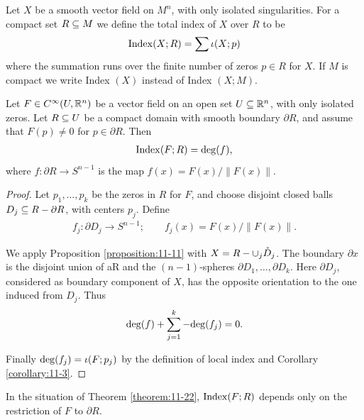 \begin{definition}\label{definition:11-21}
  Let $X$ be a smooth vector field on $M^n$, with only isolated
  singularities. For a compact set $R\subseteq M$ we define the total index of $X$ over
  $R$ to be
  \begin{align*}
    \mathrm{Index}(X; R) = \sum \iota(X; p)
  \end{align*}
  where the summation runs over the finite number of zeros $p\in R$ for $X$. If $M$ is
  compact we write Index $(X)$ instead of Index $(X; M)$.
\end{definition}

\begin{theorem}\label{theorem:11-22}
  Let $F\in C^\infty(U, {\mathbb{R}}^n)$ be a vector field on an open set $U\subseteq{\ensuremath{\mathbb{R}}}^n$,
with only isolated zeros. Let $R\subseteq U$ be a compact domain with smooth boundary
$\partial R$, and assume that $F(p)\neq 0$ for $p\in\partial R$. Then
\begin{align*}
  \mathrm{Index}(F; R) = \mathrm{deg}(f),
\end{align*}
where $f:\partial R\to S^{n-1}$ is the map $f(x) = F(x)/\|F(x)\|$.
\end{theorem}

\begin{proof}
  Let $p_1, \ldots, p_k$ be the zeros in $R$ for $F$, and choose disjoint closed balls
$D_j\subseteq R-\partial R$, with centers $p_j$. Define
\begin{align*}
  f_j: \partial D_j \to S^{n-1}; \qquad f_j(x) = F(x)/\|F(x)\|.
\end{align*}

We apply Proposition \ref{proposition:11-11} with $X = R-\cup_{j}\mathring{D}_j$. The boundary $\partial x$ 
is the disjoint union of aR and the $(n - 1)$-spheres $\partial D_1, \ldots, \partial D_k$. Here $\partial D_j$, 
considered as boundary component of $X$, has the opposite orientation to the one induced from $D_j$. 
Thus
\begin{align*}
  \mathrm{deg}(f) + \sum_{j=1}^{k}{-\mathrm{deg}(f_j)} = 0.
\end{align*}

Finally $\mathrm{deg}(f_j) = \iota(F; p_j)$ by the definition of local index and Corollary \ref{corollary:11-3}.
\end{proof}

\begin{corollary}\label{corollary:11-23}
  In the situation of Theorem \ref{theorem:11-22}, $\mathrm{Index}(F; R)$ depends only on
the restriction of $F$ to $\partial R$.
\end{corollary}

